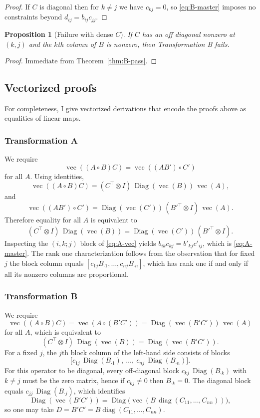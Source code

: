 \documentclass[11pt,a4paper]{article}
\newtheorem{proposition}[theorem]{Proposition}
\theoremstyle{definition}
\newcommand{\Had}{\circ}
\newcommand{\diag}{\operatorname{diag}}
\newcommand{\Diag}{\operatorname{Diag}}
\newcommand{\vecop}{\operatorname{vec}}
\begin{document}
\begin{proof}
If $C$ is diagonal then for $k\ne j$ we have $c_{k j}=0$, so \eqref{eq:B-master} imposes no constraints beyond $d_{i j}=b_{i j}c_{j j}$.
\end{proof}

\begin{proposition}[Failure with dense $C$]\label{prop:B-fail}
If $C$ has an off diagonal nonzero at $(k,j)$ and the $k$th column of $B$ is nonzero, then Transformation B fails.
\end{proposition}

\begin{proof}
Immediate from Theorem~\ref{thm:B-pass}.
\end{proof}

\subsection{Vectorized proofs}
For completeness, I give vectorized derivations that encode the proofs above as equalities of linear maps.

\subsubsection*{Transformation A}
We require
\[
\vecop((A\Had B)C) = \vecop((AB')\Had C')
\]
for all $A$. Using identities,
\[
\vecop((A\Had B)C) = (C^\top\!\otimes I)\,\Diag(\vecop(B))\,\vecop(A),
\]
and
\[
\vecop((AB')\Had C') = \Diag(\vecop(C'))\,(B'^\top\!\otimes I)\,\vecop(A).
\]
Therefore equality for all $A$ is equivalent to
\begin{equation}\label{eq:A-vec}
(C^\top\!\otimes I)\,\Diag(\vecop(B)) = \Diag(\vecop(C'))\,(B'^\top\!\otimes I).
\end{equation}
Inspecting the $(i,k;j)$ block of \eqref{eq:A-vec} yields $b_{i k} c_{k j}=b'_{k j} c'_{i j}$, which is \eqref{eq:A-master}. The rank one characterization follows from the observation that for fixed $j$ the block column equals $[c_{1 j}B_{\cdot 1}, \dots, c_{n j}B_{\cdot n}]$, which has rank one if and only if all its nonzero columns are proportional.

\subsubsection*{Transformation B}
We require
\[
\vecop((A\Had B)C) = \vecop(A\Had (B'C')) = \Diag(\vecop(B'C'))\,\vecop(A)
\]
for all $A$, which is equivalent to
\[
(C^\top\!\otimes I)\,\Diag(\vecop(B)) = \Diag(\vecop(B'C')).
\]
For a fixed $j$, the $j$th block column of the left-hand side consists of blocks
\[
\big[c_{1 j}\,\Diag(B_{\cdot 1}),\ \dots,\ c_{n j}\,\Diag(B_{\cdot n})\big].
\]
For this operator to be diagonal, every off-diagonal block $c_{k j}\,\Diag(B_{\cdot k})$ with $k\ne j$ must be the zero matrix, hence if $c_{k j}\ne 0$ then $B_{\cdot k}=0$. The diagonal block equals $c_{j j}\,\Diag(B_{\cdot j})$, which identifies
\[
\Diag(\vecop(B'C'))=\Diag\!\big(\vecop(B\,\diag(C_{11},\dots,C_{nn}))\big),
\]
so one may take $D=B'C'=B\diag(C_{11},\dots,C_{nn})$.
\end{document}
